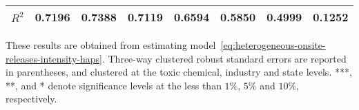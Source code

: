 \begin{table}[H]
{\begin{tabular}{@{}llllllll@{}}
            $R^2$                           & 0.7196    & 0.7388        & 0.7119    & 0.6594       & 0.5850          & 0.4999        & 0.1252              \\ \bottomrule\bottomrule
        \end{tabular}%
    }
    \begin{minipage}{18cm}
        \vspace{0.05in}
        These results are obtained from estimating model~\ref{eq:heterogeneous-onsite-releases-intensity-haps}. Three-way clustered robust standard errors are reported in parentheses, and clustered at the toxic chemical, industry and state levels. ***, **, and * denote significance levels at the less than $1\%$, $5\%$ and $10\%$, respectively.
    \end{minipage}
\end{table}
